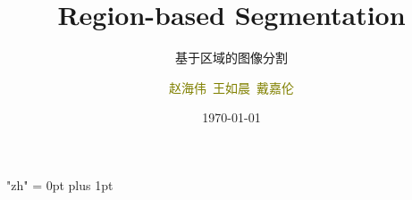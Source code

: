 \documentclass[notheorems,mathserif,table,compress]{beamer}  %
\begin{document}
\XeTeXlinebreaklocale "zh"         %
\XeTeXlinebreakskip = 0pt plus 1pt %

\title[Region-based Segmentation]{Region-based Segmentation}
\subtitle{基于区域的图像分割}
\author[赵海伟\ 王如晨\ 戴嘉伦]{\textcolor{olive}{赵海伟\ 王如晨\ 戴嘉伦}}
\institute[CVBIOUC]{\small\textcolor{violet}{CVBIOUC}}
\date{\today}
\frame{ \titlepage }

\end{document}
